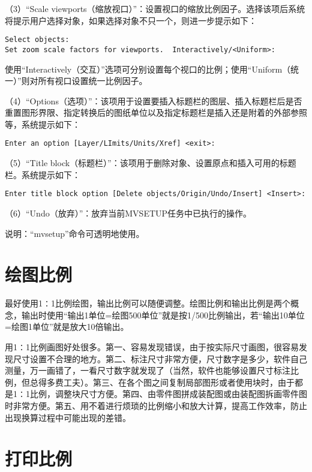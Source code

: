 （3）“Scale viewports（缩放视口）”：设置视口的缩放比例因子。选择该项后系统将提示用户选择对象，如果选择对象不只一个，则进一步提示如下：

\begin{verbatim}
Select objects:
Set zoom scale factors for viewports.  Interactively/<Uniform>:
\end{verbatim}

使用“Interactively（交互）”选项可分别设置每个视口的比例；使用“Uniform（统一）”则对所有视口设置统一比例因子。

（4）“Options（选项）”：该项用于设置要插入标题栏的图层、插入标题栏后是否重置图形界限、指定转换后的图纸单位以及指定标题栏是插入还是附着的外部参照等，系统提示如下：

\begin{verbatim}
Enter an option [Layer/LImits/Units/Xref] <exit>:
\end{verbatim}

（5）“Title block（标题栏）”：该项用于删除对象、设置原点和插入可用的标题栏。系统提示如下：

\begin{verbatim}
Enter title block option [Delete objects/Origin/Undo/Insert] <Insert>:
\end{verbatim}

（6）“Undo（放弃）”：放弃当前MVSETUP任务中已执行的操作。

说明：“mvsetup”命令可透明地使用。

\chapter{绘图比例}

最好使用1∶1比例绘图，输出比例可以随便调整。绘图比例和输出比例是两个概念，输出时使用“输出1单位=绘图500单位”就是按1/500比例输出，若“输出10单位=绘图1单位”就是放大10倍输出。

用1∶1比例画图好处很多。第一、容易发现错误，由于按实际尺寸画图，很容易发现尺寸设置不合理的地方。第二、标注尺寸非常方便，尺寸数字是多少，软件自己测量，万一画错了，一看尺寸数字就发现了（当然，软件也能够设置尺寸标注比例，但总得多费工夫）。第三、在各个图之间复制局部图形或者使用块时，由于都是1∶1比例，调整块尺寸方便。第四、由零件图拼成装配图或由装配图拆画零件图时非常方便。第五、用不着进行烦琐的比例缩小和放大计算，提高工作效率，防止出现换算过程中可能出现的差错。 




\chapter{打印比例}

